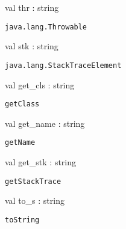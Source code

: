 \documentclass[11pt]{article}
\begin{document}
\begin{ocamldocsigend}
\label{val:Java.Lang.thr}\begin{ocamldoccode}
val thr : string
\end{ocamldoccode}
\begin{ocamldocdescription}
{\tt{java.lang.Throwable}}


\end{ocamldocdescription}


\label{val:Java.Lang.stk}\begin{ocamldoccode}
val stk : string
\end{ocamldoccode}
\begin{ocamldocdescription}
{\tt{java.lang.StackTraceElement}}


\end{ocamldocdescription}


\label{val:Java.Lang.get-underscorecls}\begin{ocamldoccode}
val get_cls : string
\end{ocamldoccode}
\begin{ocamldocdescription}
{\tt{getClass}}


\end{ocamldocdescription}


\label{val:Java.Lang.get-underscorename}\begin{ocamldoccode}
val get_name : string
\end{ocamldoccode}
\begin{ocamldocdescription}
{\tt{getName}}


\end{ocamldocdescription}


\label{val:Java.Lang.get-underscorestk}\begin{ocamldoccode}
val get_stk : string
\end{ocamldoccode}
\begin{ocamldocdescription}
{\tt{getStackTrace}}


\end{ocamldocdescription}


\label{val:Java.Lang.to-underscores}\begin{ocamldoccode}
val to_s : string
\end{ocamldoccode}
\begin{ocamldocdescription}
{\tt{toString}}


\end{ocamldocdescription}



\end{ocamldocsigend}
\end{document}
